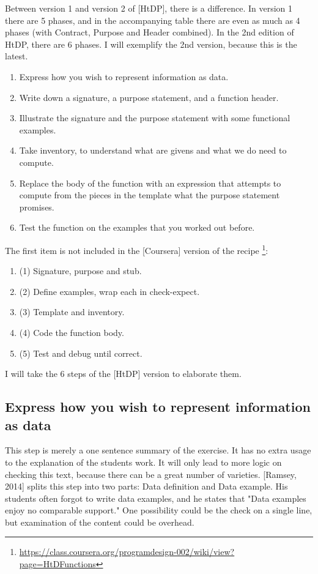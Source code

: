 \documentclass{article}
\begin{document}
Between version 1 and version 2 of [HtDP], there is a difference.
In version 1 there are 5 phases, and in the accompanying table there are even
as much as 4 phases (with Contract, Purpose and Header combined).
In the 2nd edition of HtDP, there are 6 phases.
I will exemplify the 2nd version, because this is the latest.

\begin{enumerate}
 \item Express how you wish to represent information as data.
 \item Write down a signature, a purpose statement, and a function header.
 \item Illustrate the signature and the purpose statement with some functional examples.
 \item Take inventory, to understand what are givens and what we do need to compute.
 \item Replace the body of the function with an expression that attempts to compute from the pieces in the template what the purpose statement promises.
 \item Test the function on the examples that you worked out before.
\end{enumerate}
 
 The first item is not included in the [Coursera] version of the recipe
 \footnote{\url{https://class.coursera.org/programdesign-002/wiki/view?page=HtDFunctions}}:
 
\begin{enumerate}
  \item (1) Signature, purpose and stub.
  \item (2) Define examples, wrap each in check-expect.
  \item (3) Template and inventory.
  \item (4) Code the function body.
  \item (5) Test and debug until correct.
\end{enumerate}

I will take the 6 steps of the [HtDP] version to elaborate them.

\subsection{Express how you wish to represent information as data}
This step is merely a one sentence summary of the exercise. It has no
extra usage to the explanation of the students work. It will only lead to more
logic on checking this text, because there can be a great number of varieties.
[Ramsey, 2014] splits this step into two parts: Data definition and Data example.
His students often forgot to write data examples, and he states that
"Data examples enjoy no comparable support."
One possibility could be the check on a single line, but examination of the
content could be overhead.
\end{document}
